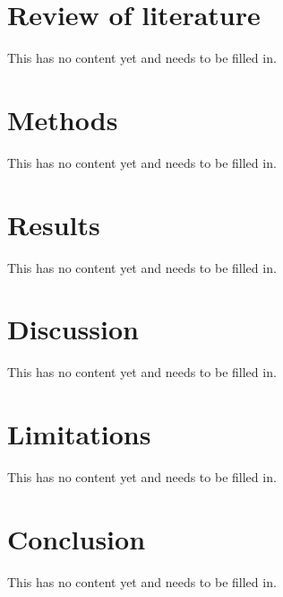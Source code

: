 \documentclass[conference]{IEEEtran}
\begin{document}
\section{Review of literature}
This has no content yet and needs to be filled in. 

\section{Methods}
This has no content yet and needs to be filled in. 

\section{Results}
This has no content yet and needs to be filled in. 

\section{Discussion}
This has no content yet and needs to be filled in. 

\section{Limitations}
This has no content yet and needs to be filled in. 

\section{Conclusion}
This has no content yet and needs to be filled in. 



\appendices
\end{document}
